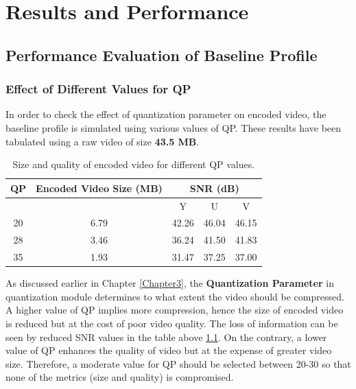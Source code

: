
\chapter{Results and Performance} %
\label{Chapter5}


\section{Performance Evaluation of Baseline Profile}

\subsection{Effect of Different Values for QP}
In order to check the effect of quantization parameter on encoded video, the baseline profile is simulated using various values of QP. These results have been tabulated using a raw video of size \textbf{43.5 MB}.
\begin{table}[H]
\centering
\begin{tabular}{|c|c|c|c|c|} \hline
QP  & Encoded Video Size (MB) & \multicolumn{3}{|c|}{SNR (dB)}  \\ \hline
    &                    &  Y & U & V \\ \hline
20  &    6.79            & 42.26   & 46.04  & 46.15  \\ \hline
28  &    3.46            & 36.24   & 41.50  & 41.83  \\ \hline
35  &    1.93            & 31.47   & 37.25  & 37.00  \\ \hline
\end{tabular}
\caption{Size and quality of encoded video for different QP values.}
\label{tab:qp}
\end{table}
As discussed earlier in Chapter \ref{Chapter3}, the \textbf{Quantization Parameter} in quantization module determines to what extent the video should be compressed. A higher value of QP implies more compression, hence the size of encoded video is reduced but at the cost of poor video quality. The loss of information can be seen by reduced SNR values in the table above \ref{tab:qp}. On the contrary, a lower value of QP enhances the quality of video but at the expense of greater video size. Therefore, a moderate value for QP should be selected between 20-30 so that none of the metrics (size and quality) is compromised. 

